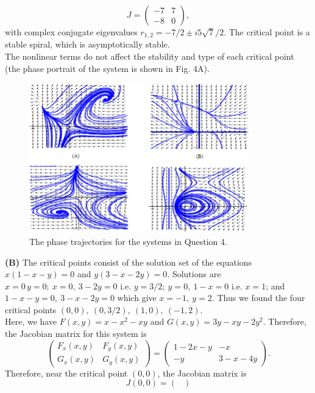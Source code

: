 \documentclass[11pt,a4paper]{article}
\begin{document}
\begin{enumerate}
		$$
		J =
		\begin{pmatrix}
			-7 & 7\\
			-8 & 0
		\end{pmatrix},
		$$
		with complex conjugate eigenvalues $r_{1,2} = -7/2 \pm i5\sqrt{7}/2$. The critical point is a stable spiral, which is asymptotically stable.\\
		The nonlinear terms do not affect the stability and type of each critical point (the phase portrait of the system is shown in Fig. 4A).
		\begin{figure}[H]
			\centering
			\includegraphics[width=0.85\textwidth]{figure/6_fig4.PNG}
			\caption{The phase trajectories for the systems in Question 4.}
		\end{figure}
		\textbf{(B)} The critical points consist of the solution set of the equations $x(1 - x - y) = 0$ and $y(3 - x - 2y) = 0$. Solutions are $x = 0\, y = 0;\ x = 0,\ 3 - 2y = 0$ i.e. $y = 3/2;\ y = 0,\ 1 - x = 0$ i.e. $x = 1$; and $1 - x - y = 0,\ 3 - x - 2y = 0$ which give $x = -1,\ y = 2$. Thus we found the four critical points $(0, 0),\ (0, 3/2),\ (1, 0),\ (-1, 2)$.\\
		Here, we have $F(x, y) = x - x^2 - xy$ and $G(x, y) = 3y - xy - 2y^2$. Therefore, the Jacobian matrix for this system is
		$$
		\begin{pmatrix}
			F_x(x,y) & F_y(x, y)\\
			G_x(x, y) & G_y(x, y)
		\end{pmatrix} =
		\begin{pmatrix}
			1 - 2x - y & -x\\
			-y & 3 - x - 4y
		\end{pmatrix}.
		$$
		Therefore, near the critical point $(0, 0)$, the Jacobian matrix is
		$$
		J(0, 0) =
		\begin{pmatrix}

\end{pmatrix}$$
\end{enumerate}
\end{document}
